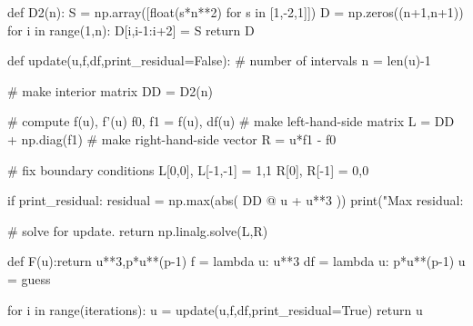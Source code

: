     def D2(n):
        S = np.array([float(s*n**2) for s in [1,-2,1]])
        D = np.zeros((n+1,n+1))
        for i in range(1,n):
            D[i,i-1:i+2] = S
        return D

    def update(u,f,df,print_residual=False):
        # number of intervals
        n = len(u)-1

        # make interior matrix
        DD = D2(n)

        # compute f(u), f'(u)
        f0, f1 = f(u), df(u)
        # make left-hand-side matrix
        L = DD + np.diag(f1)
        # make right-hand-side vector
        R = u*f1 - f0

        # fix boundary conditions 
        L[0,0], L[-1,-1] = 1,1
        R[0],   R[-1]    = 0,0
 
        if print_residual:
            residual = np.max(abs( DD @ u + u**3 ))
            print("Max residual: %
    
        # solve for update.
        return np.linalg.solve(L,R)

    def F(u):return u**3,p*u**(p-1)
    f  = lambda u: u**3
    df = lambda u: p*u**(p-1)
    u = guess

    for i in range(iterations):
        u = update(u,f,df,print_residual=True)
        return u
 
